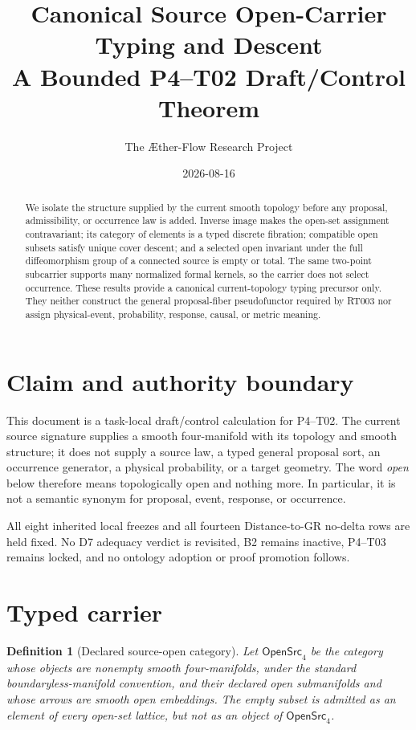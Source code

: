 \documentclass[11pt]{article}
\title{Canonical Source Open-Carrier Typing and Descent\\A Bounded P4--T02 Draft/Control Theorem}
\author{The \AE ther-Flow Research Project}
\date{2026-08-16}
\newtheorem{definition}{Definition}
\begin{document}
\maketitle

\begin{abstract}
We isolate the structure supplied by the current smooth topology before any
proposal, admissibility, or occurrence law is added.  Inverse image makes the
open-set assignment contravariant; its category of elements is a typed discrete
fibration; compatible open subsets satisfy unique cover descent; and a selected
open invariant under the full diffeomorphism group of a connected source is
empty or total.  The same two-point subcarrier supports many normalized formal
kernels, so the carrier does not select occurrence.  These results provide a
canonical current-topology typing precursor only.  They neither construct the
general proposal-fiber pseudofunctor required by RT003 nor assign physical-event,
probability, response, causal, or metric meaning.
\end{abstract}

\section{Claim and authority boundary}

This document is a task-local draft/control calculation for P4--T02.  The
current source signature supplies a smooth four-manifold with its topology and
smooth structure; it does not supply a source law, a typed general proposal
sort, an occurrence generator, a physical probability, or a target geometry.
The word \emph{open} below therefore means topologically open and nothing more.
In particular, it is not a semantic synonym for proposal, event, response, or
occurrence.

All eight inherited local freezes and all fourteen Distance-to-GR no-delta
rows are held fixed.  No D7 adequacy verdict is revisited, B2 remains inactive,
P4--T03 remains locked, and no ontology adoption or proof promotion follows.

\section{Typed carrier}

\begin{definition}[Declared source-open category]
Let $\mathsf{OpenSrc}_4$ be the category whose objects are nonempty smooth
four-manifolds, under the standard boundaryless-manifold convention, and their
declared open submanifolds and whose arrows are smooth open embeddings.  The
empty subset is admitted as an element of every open-set lattice, but not as an
object of $\mathsf{OpenSrc}_4$.
\end{definition}
\end{document}
